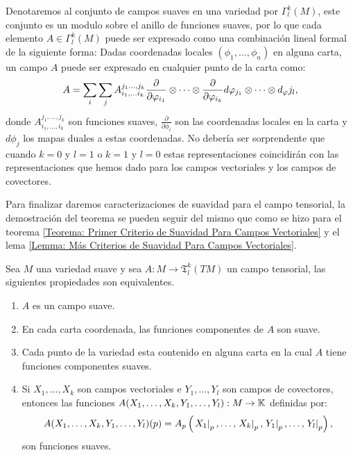 Denotaremos al conjunto de campos suaves en una variedad por
$\Gamma^{k}_{l}(M)$, este conjunto es un modulo sobre el anillo de funciones
suaves, por lo que cada elemento $A \in \Gamma^{k}_{l}(M)$ puede ser expresado
como una combinación lineal formal de la siguiente forma: Dadas coordenadas
locales $(\phi_1, \ldots, \phi_n)$ en alguna carta, un campo $A$ puede ser
expresado en cualquier punto de la carta como:
\[
	A = \sum_{i}\sum_{j}
	A_{i_1, \ldots i_k}^{j_1 \ldots, j_k}
	\frac{\partial}{\partial \varphi_{i_1}} \otimes
	\cdots \otimes \frac{\partial}{\partial \varphi_{i_k}}
	d\varphi_{j_1} \otimes \cdots \otimes d_\varphi{j_l},
\]
donde $A_{i_1,\ldots,i_k}^{j_1,\ldots,j_k}$ son funciones suaves,
$\frac{\partial}{\partial \phi_i}$ son las coordenadas locales en la carta y
$d\phi_{j}$ los mapas duales a estas coordenadas. No debería ser sorprendente
que cuando $k=0$ y $l=1$ o $k=1$ y $l=0$ estas representaciones coincidirán con las
representaciones que hemos dado para los campos vectoriales y los campos de
covectores.

Para finalizar daremos caracterizaciones de suavidad para el campo tensorial, la
demostración del teorema se pueden seguir del mismo que como se hizo para el
teorema \ref{Teorema: Primer Criterio de Suavidad Para Campos Vectoriales} y el
lema \ref{Lemma: Más Criterios de Suavidad Para Campos Vectoriales}.

\begin{theorem}
	Sea $M$ una variedad suave y sea $A: M \to \mathfrak{T}^{k}_{l}(TM)$
	un campo tensorial, las siguientes propiedades son equivalentes.
	\begin{enumerate}
		\item $A$ es un campo suave.
		\item En cada carta coordenada, las funciones componentes de $A$ son
		      suave.
		\item Cada punto de la variedad esta contenido en alguna carta en la cual
		      $A$ tiene funciones componentes suaves.
		\item Si $X_1, \ldots, X_k$ son campos vectoriales e $Y_1, \ldots, Y_l$ son
		      campos de covectores, entonces las funciones $A(X_1, \ldots, X_k,
          Y_1,\ldots,Y_l):
			      M \to \mathbb{K}$ definidas por:
		      \[
			      A(X_1,\ldots,X_k,Y_1,\ldots,Y_l)(p)
			      =
			      A_p 
            \left( 
            \left. X_1 \right|_{p}, 
            \ldots, 
            \left. X_k \right|_{p},
            \left. Y_{1} \right|_{p}, 
            \ldots, 
            \left. Y_{l} \right|_{p} 
            \right),
		      \]
          son funciones suaves.
	\end{enumerate}
\end{theorem}
